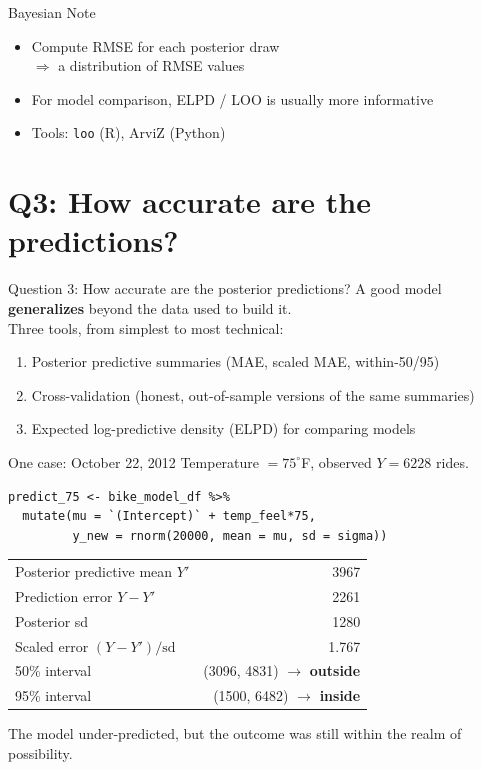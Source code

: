 \documentclass[aspectratio=43,11pt]{beamer}
\begin{document}
\begin{frame}{Bayesian Note}
  \begin{itemize}
    \item Compute RMSE for each posterior draw\\
          $\Rightarrow$ a distribution of RMSE values
    \item For model comparison, ELPD / LOO is usually more informative
    \item Tools: \texttt{loo} (R), ArviZ (Python)
  \end{itemize}
\end{frame}

{
\section{Q3: How accurate are the predictions?}

\begin{frame}{Question 3: How accurate are the posterior predictions?}
  A good model \textbf{generalizes} beyond the data used to build it.\\
  Three tools, from simplest to most technical:
  \begin{enumerate}
    \item Posterior predictive summaries (MAE, scaled MAE, within-50/95)
    \item Cross-validation (honest, out-of-sample versions of the same summaries)
    \item Expected log-predictive density (ELPD) for comparing models
  \end{enumerate}
\end{frame}

\begin{frame}[fragile]{One case: October 22, 2012}
  Temperature $=75^\circ$F, observed $Y=6228$ rides.
\begin{lstlisting}
predict_75 <- bike_model_df %>%
  mutate(mu = `(Intercept)` + temp_feel*75,
         y_new = rnorm(20000, mean = mu, sd = sigma))
\end{lstlisting}
  \begin{center}
  \begin{tabular}{lr}
    \toprule
    Posterior predictive mean $Y'$ & 3967\\
    Prediction error $Y-Y'$ & 2261\\
    Posterior sd & 1280\\
    Scaled error $(Y-Y')/\text{sd}$ & 1.767\\
    50\% interval & (3096, 4831) $\to$ \textbf{outside}\\
    95\% interval & (1500, 6482) $\to$ \textbf{inside}\\
    \bottomrule
  \end{tabular}
  \end{center}
  The model under-predicted, but the outcome was still within the realm of possibility.
\end{frame}

}
\end{document}

